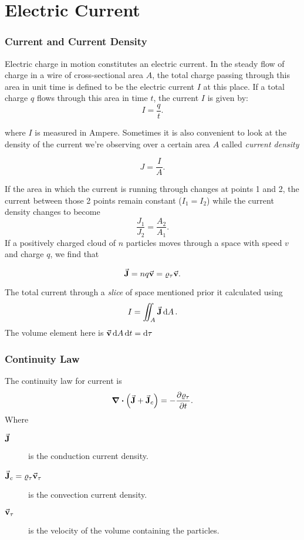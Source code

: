 \part{Electric Current}
\section{Current and Current Density}

Electric charge in motion constitutes an electric current. In the steady flow of
charge in a wire of cross-sectional area $A$, the total charge passing through this
area in unit time is defined to be the electric current $I$ at this place. If a total
charge $q$ flows through this area in time $t$, the current $I$ is given by:
\begin{equation}
	I = \frac{q}{t}
	.\end{equation}

where $I$ is measured in Ampere. Sometimes it is also convenient to look at the density of the current we're observing over a certain area $A$ called \emph{current density}

\begin{equation}
	J=\frac{I}{A}
	.\end{equation}

If the area in which the current is running through changes at points  1 and 2, the current between those 2 points remain constant ($I_1=I_2$) while the current density changes to become
\[
	\frac{J_1}{J_2}=\frac{A_2}{A_1}
	.\]
If a positively charged cloud of $n$ particles moves through a space with speed $v$ and charge $q$, we find that

\begin{equation}
	\va{J}=nq\va{v}=\varrho_\tau \va{v}
	.\end{equation}

The total current through a \emph{slice} of space mentioned prior it calculated using
\begin{equation}
	I=\iint_A \va{J}\dd{A}
	.\end{equation}
The volume element here is $\va{v}\dd {A}\dd {t}=\dd {\tau}$

\section{Continuity Law}
The continuity law for current is
\begin{equation}
	\div(\va{J}+\va{J}_c)=-\pdv{\varrho_\tau}{t}
	.\end{equation}
Where
\begin{description}
	\item[$\va{J}$ ] is the conduction current density.
	\item[$\va{J}_c=\varrho_\tau\va{v}_\tau$ ] is the convection current density.
	\item [$\va{v}_\tau$] is the velocity of the volume containing the particles.
\end{description}

